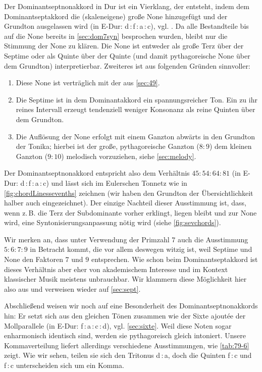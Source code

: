 Der Dominantseptnonakkord in Dur ist ein Vierklang, der entsteht, indem dem
Dominantseptakkord die (skaleneigene) große None hinzugefügt und der Grundton
ausgelassen wird (in \flat E-Dur: d\,:\,f\,:\,\flat a\,:\,c),
vgl. \cite[{}11.3]{Skript}.  Da alle Bestandteile bis auf die None bereits in
\cref{sec:dom7syn} besprochen wurden, bleibt nur die Stimmung der None zu
klären.  Die None ist entweder als große Terz über der Septime oder als Quinte
über der Quinte (und damit pythagoreische None über dem Grundton)
interpretierbar.  Zweiteres ist aus folgenden Gründen sinnvoller:
\begin{enumerate}
  \item Diese None ist verträglich mit der aus \cref{sec:49}.
  \item Die Septime ist in dem Dominantakkord ein spannungsreicher Ton.  Ein zu
    ihr reines Intervall erzeugt tendenziell weniger Konsonanz als reine Quinten
    über dem Grundton.
  \item Die Auflösung der None erfolgt mit einem Ganzton abwärts in den Grundton
  der Tonika; hierbei ist der große, pythagoreische Ganzton ($8:9$) dem kleinen
  Ganzton ($9:10$) melodisch vorzuziehen, siehe \cref{sec:melody}.
\end{enumerate}
Der Dominantseptnonakkord entspricht also dem Verhältnis $45:54:64:81$ (in \flat
E-Dur: \naturalm d\,:\,f\,:\,\flat a\,:\,c) und lässt sich im Eulerschen Tonnetz
wie in \cref{fig:chordLinessevenths} zeichnen (wir haben den Grundton der
Übersichtlichkeit halber auch eingezeichnet). Der einzige Nachteil dieser
Ausstimmung ist, dass, wenn z.\,B. die Terz der Subdominante vorher erklingt,
liegen bleibt und zur None wird, eine Syntonisierungsanpassung nötig wird (siehe
\cref{fig:sevchords}).

Wir merken an, dass unter Verwendung der Primzahl $7$ auch die Ausstimmung
$5:6:7:9$ in Betracht kommt, die vor allem deswegen witzig ist, weil Septime und
None den Faktoren $7$ und $9$ entsprechen.  Wie schon beim Dominantseptakkord
ist dieses Verhältnis aber eher von akademischem Interesse und im Kontext
klassischer Musik meistens unbrauchbar. Wir klammern diese Möglichkeit hier also
aus und verweisen wieder auf \cref{sec:sept}.

Abschließend weisen wir noch auf eine Besonderheit des Dominantseptnonakkords
hin: Er setzt sich aus den gleichen Tönen zusammen wie der Sixte ajoutée der
Mollparallele (in \flat E-Dur: f\,:\,\flat a\,:\,c\,:\,d),
vgl. \cref{sec:sixte}. Weil diese Noten sogar enharmonisch identisch sind,
werden sie pythagoreisch gleich intoniert. Unsere Kommaverteilung liefert
allerdings verschiedene Ausstimmungen, wie \cref{tab:79-6} zeigt.  Wie wir
sehen, teilen sie sich den Tritonus \naturalm d\,:\,\flat a, doch die Quinten
f\,:\,c und \naturalm f\,:\,\naturalm c unterscheiden sich um ein Komma.

